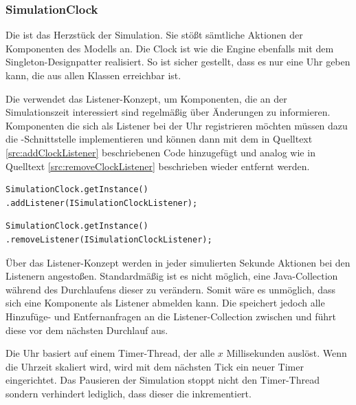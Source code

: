 \subsubsection{SimulationClock}
Die  ist das Herzstück der Simulation. Sie stößt sämtliche Aktionen der Komponenten des Modells an. Die Clock ist wie die Engine ebenfalls mit dem Singleton-Designpatter realisiert. So ist sicher gestellt, dass es nur eine Uhr geben kann, die aus allen Klassen erreichbar ist.

Die  verwendet das Listener-Konzept, um Komponenten, die an der Simulationszeit interessiert sind regelmäßig über Änderungen zu informieren. Komponenten die sich als Listener bei der Uhr registrieren möchten müssen dazu die -Schnitt\-stel\-le implementieren und können dann mit dem in Quelltext \ref{src:addClockListener} beschriebenen Code hinzugefügt und analog wie in Quelltext \ref{src:removeClockListener} beschrieben wieder entfernt werden.

\begin{illfloat}
  \begin{lstlisting}
SimulationClock.getInstance()
.addListener(ISimulationClockListener);
  \end{lstlisting}
\label{src:addClockListener}
\end{illfloat}
\begin{illfloat}
\begin{lstlisting}
SimulationClock.getInstance()
.removeListener(ISimulationClockListener);
\end{lstlisting}
\label{src:removeClockListener}
\end{illfloat}

Über das Listener-Konzept werden in jeder simulierten Sekunde Aktionen bei den Listenern angestoßen. Standardmäßig ist es nicht möglich, eine Java-Collection während des Durchlaufens dieser zu verändern. Somit wäre es unmöglich, dass sich eine Komponente als Listener abmelden kann. Die  speichert jedoch alle Hinzufüge- und Entfernanfragen an die Listener-Collection zwischen und führt diese vor dem nächsten Durchlauf aus.

Die Uhr basiert auf einem Timer-Thread, der alle $x$ Millisekunden auslöst. Wenn die Uhrzeit skaliert wird, wird mit dem nächsten Tick ein neuer Timer eingerichtet. Das Pausieren der Simulation stoppt nicht den Timer-Thread sondern verhindert lediglich, dass dieser die  inkrementiert.


